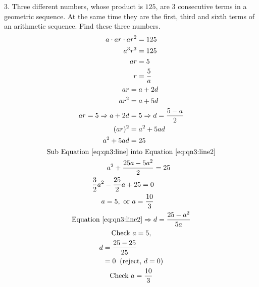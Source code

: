 \documentclass[12pt]{article}
\begin{document}
\setcounter{equation}{0}
3. Three different numbers, whose product is $125$, are $3$ consecutive terms in a geometric sequence. At the same time they are the first, third and sixth terms of an arithmetic sequence. Find these three numbers.
\begin{gather*}
	\begin{aligned}
		a\cdot ar\cdot ar^2 & = 125         \\
		a^3r^3              & = 125         \\
		ar                  & = 5           \\
		r                   & = \frac{5}{a}
	\end{aligned} \\
	\begin{align}
		ar                        & = a + 2d    \notag                                           \\
		ar^2                      & = a + 5d   \notag                                            \\
		ar = 5 \Rightarrow a + 2d & = 5 \Rightarrow d = \frac{5 - a}{2}      \label{eq:qn3:line} \\
		(ar)^2                    & = a^2 +5ad \notag                                            \\
		a^2 + 5ad                 & = 25  \label{eq:qn3:line2}
	\end{align} \\
	\text{Sub Equation } \eqref{eq:qn3:line} \text{ into Equation } \eqref{eq:qn3:line2}  \\
	\begin{aligned}
		a^2 + \frac{25a - 5a^2}{2} & = 25     \\
		\frac{3}{2}a^2 - \frac{25}{2}a+25 = 0 \\
		a = 5, \text{ or } a = \frac{10}{3}
	\end{aligned} \\
	\begin{align}
		\text{Equation } \eqref{eq:qn3:line2} \Rightarrow d = \frac{25-a^2}{5a}
	\end{align} \\
	\text{Check } a = 5,  \\
	\begin{aligned}
		d & = \frac{25 - 25}{25}                     \\
		  & = 0 \;\; \text{(reject, } d = 0 \text{)}
	\end{aligned} \\
	\text{Check } a = \frac{10}{3}  \\

\end{gather*}
\end{document}
